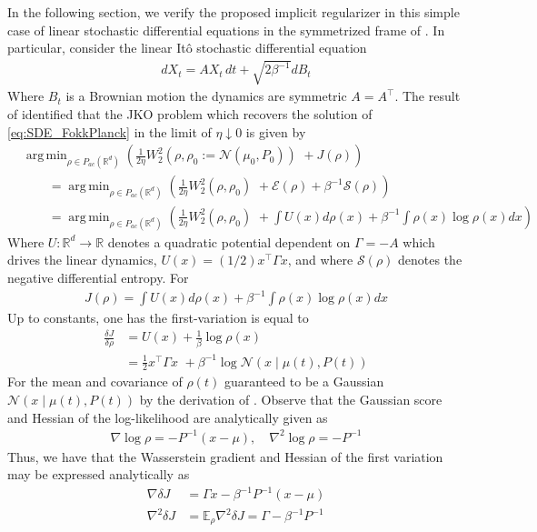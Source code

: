 \documentclass[reqno,11pt,letterpaper]{amsart}
\theoremstyle{plain}
\theoremstyle{definition}
\theoremstyle{remark}
\DeclareMathOperator*{\argmin}{arg\,min}
\begin{document}
In the following section, we verify the proposed implicit regularizer in this simple case of linear stochastic differential equations in the symmetrized frame of \cite{Halder2017}. In particular, consider the linear It\^o stochastic differential equation
\begin{align}\label{eq:SDE_FokkPlanck}
    dX_{t} = A X_{t} \,dt + \sqrt{2\beta^{-1}} dB_{t}
\end{align}
Where $B_{t}$ is a Brownian motion the dynamics are symmetric $A = A^{\top}$. The result of \cite{Halder2017} identified that the JKO problem which recovers the solution of \eqref{eq:SDE_FokkPlanck} in the limit of $\eta \downarrow 0$ is given by
\begin{align*}
    &\argmin_{\rho \in {P}_{ac}(\mathbb{R}^{d})} \left( \frac{1}{2 \eta} W_{2}^{2}(\rho, \rho_{0} := \mathcal{N}(\mu_{0}, P_{0}) ) \,\, + J(\rho) \right)\\
    &\qquad = \argmin_{\rho \in {P}_{ac}(\mathbb{R}^{d})} \left( \frac{1}{2 \eta} W_{2}^{2}(\rho, \rho_{0} ) \,\, + \mathcal{E}(\rho) + \beta^{-1} \mathcal{S}(\rho) \right) \\
    &\qquad = \argmin_{\rho \in {P}_{ac}(\mathbb{R}^{d})} \left( \frac{1}{2 \eta} W_{2}^{2}(\rho, \rho_{0} ) \,\, + \int U(x) d \rho(x) + \beta^{-1} \int \rho(x) \log\rho(x) d x \right)
\end{align*}
Where $U: \mathbb{R}^{d} \to \mathbb{R}$ denotes a quadratic potential dependent on $\Gamma = -A$ which drives the linear dynamics, $U(x) = (1/2) x^{\top}\Gamma x$, and where $\mathcal{S}(\rho)$ denotes the negative differential entropy. For 
\begin{align*}
J(\rho) = \int U(x) d \rho(x) + \beta^{-1} \int \rho(x) \log\rho(x) d x
\end{align*}
Up to constants, one has the first-variation is equal to
\begin{align*}
    \frac{\delta J}{\delta \rho} &= U(x) + \frac{1}{\beta} \log\rho(x) \\
    &= \frac{1}{2} x^{\top} \Gamma x \,\, + \beta^{-1} \log\mathcal{N}\left(x \mid \mu(t), P(t) \right)
\end{align*}
For the mean and covariance of $\rho(t)$ guaranteed to be a Gaussian $\mathcal{N}\left(x \mid \mu(t), P(t) \right)$ by the derivation of \cite{Halder2017}. 
Observe that the Gaussian score and Hessian of the log-likelihood are analytically given as
\begin{align*}
    \nabla \log \rho = - P^{-1} (x - \mu), \quad \nabla^{2} \log\rho = - P^{-1}
\end{align*}
Thus, we have that the Wasserstein gradient and Hessian of the first variation may be expressed analytically as
\begin{align*}
    \nabla \delta J &= \Gamma x - \beta^{-1} P^{-1} (x - \mu) \\
    \nabla^{2} \delta J &= \mathbb{E}_{\rho} \nabla^{2} \delta J = \Gamma - \beta^{-1} P^{-1}
\end{align*}
\end{document}
